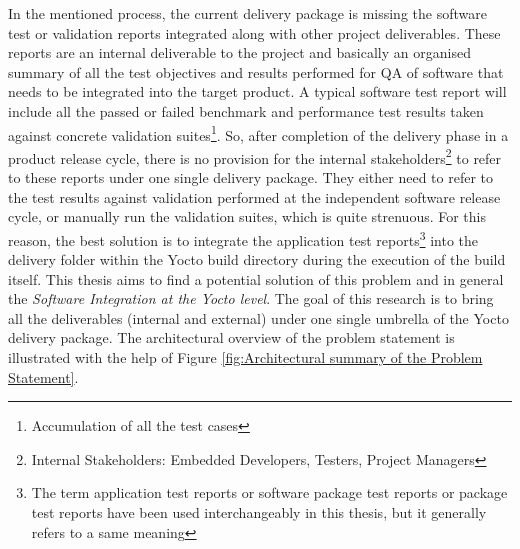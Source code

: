 In the mentioned process, the current delivery package is missing the software test or validation reports integrated along with other project deliverables. These reports are an internal deliverable to the project and basically an organised summary of all the test objectives and results performed for \ac{QA} of software that needs to be integrated into the target product. A typical software test report will include all the passed or failed benchmark and performance test results taken against concrete validation suites\footnote{Accumulation of all the test cases}. So, after completion of the delivery phase in a product release cycle, there is no provision for the internal stakeholders\footnote{Internal Stakeholders: Embedded Developers, Testers, Project Managers} to refer to these reports under one single delivery package. They either need to refer to the test results against validation performed at the independent software release cycle, or manually run the validation suites, which is quite strenuous. For this reason, the best solution is to integrate the application test reports\footnote{The term application test reports or software package test reports or package test reports have been used interchangeably in this thesis, but it generally refers to a same meaning} into the delivery folder within the Yocto build directory during the execution of the build itself. This thesis aims to find a potential solution of this problem and in general the \emph{Software Integration at the Yocto level}. The goal of this research is to bring all the deliverables (internal and external) under one single umbrella of the Yocto delivery package. The architectural overview of the problem statement is illustrated with the help of Figure \ref{fig:Architectural summary of the Problem Statement}.







